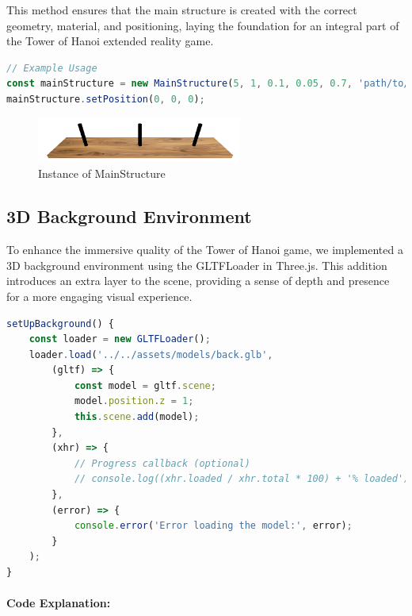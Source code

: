 \documentclass{article}
\begin{document}
This method ensures that the main structure is created with the correct geometry, material, and positioning, laying the foundation for an integral part of the Tower of Hanoi extended reality game.


\begin{lstlisting}[language=JavaScript, caption={JS Example for MainStructure}]
// Example Usage
const mainStructure = new MainStructure(5, 1, 0.1, 0.05, 0.7, 'path/to/texture_base.jpg', 'path/to/texture_cylinder.jpg')
mainStructure.setPosition(0, 0, 0);
\end{lstlisting}

\begin{figure}[h]
    \centering
    \includegraphics[width=0.6\textwidth]{img/mainStructure.png}
    \caption{Instance of MainStructure}
    \label{fig:mainStructure}
\end{figure}






\subsection{3D Background Environment}

To enhance the immersive quality of the Tower of Hanoi game, we implemented a 3D background environment using the GLTFLoader in Three.js. This addition introduces an extra layer to the scene, providing a sense of depth and presence for a more engaging visual experience.

\begin{lstlisting}[language=JavaScript, caption={JS Code for Including 3D Background}]
setUpBackground() {
    const loader = new GLTFLoader();
    loader.load('../../assets/models/back.glb', 
        (gltf) => {
            const model = gltf.scene;
            model.position.z = 1;
            this.scene.add(model);
        },
        (xhr) => {
            // Progress callback (optional)
            // console.log((xhr.loaded / xhr.total * 100) + '% loaded');
        },
        (error) => {
            console.error('Error loading the model:', error);
        }
    );
}
\end{lstlisting}

\paragraph{Code Explanation:}
\end{document}
